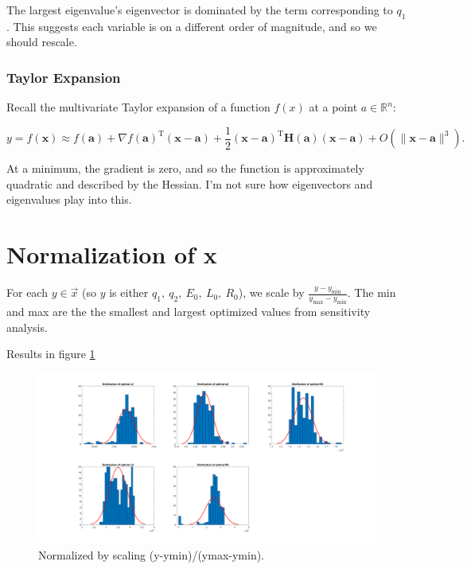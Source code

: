 \documentclass{article}
\begin{document}
The largest eigenvalue's eigenvector is dominated by the term corresponding to $q_1$.  This suggests each variable is on a different order of magnitude, and so we should rescale.

\subsubsection{Taylor Expansion}


Recall the multivariate Taylor expansion of a function $f(x)$ at a point $a\in\mathbb{R}^n$:

$$ y = f(\mathbf{x})\approx f(\mathbf{a}) + \nabla f(\mathbf{a})^\mathrm{T} (\mathbf{x}-\mathbf{a}) + \frac{1}{2}(\mathbf{x}-\mathbf{a})^\mathrm{T} \mathbf{H}(\mathbf{a}) (\mathbf{x}-\mathbf{a}) + O( \|\mathbf{x}-\mathbf{a}\|^3). $$

At a minimum, the gradient is zero, and so the function is approximately quadratic and described by the Hessian.  I'm not sure how eigenvectors and eigenvalues play into this.

\section{Normalization of \textbf{x}}

For each $y \in \vec{x}$ (so $y$ is either $q_1,~q_2,~E_0,~L_0,~R_0$),  we scale by $\frac{y- y_{\min}}{y_{\max} - y_{\min}} .$  The min and max are the the smallest and largest optimized values from sensitivity analysis.

Results in figure \ref{fig:Histo7}

\begin{figure}
	\centering
	\includegraphics[width=\textwidth]{Optimized parameter distribution across sensitivity analysis Run7Normalization}
	
	\caption{Normalized by scaling (y-ymin)/(ymax-ymin).}
	
	\label{fig:Histo7}
\end{figure}
\end{document}
